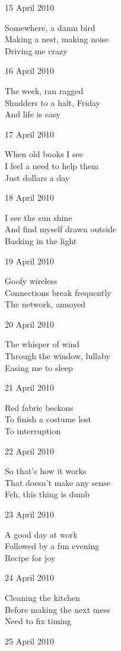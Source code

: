 \documentclass[12pt]{article}
\begin{document}
15 April 2010

Somewhere, a damn bird \\
Making a nest, making noise \\
Driving me crazy

16 April 2010

The week, ran ragged \\
Shudders to a halt, Friday \\
And life is easy

\newpage

17 April 2010

When old books I see \\
I feel a need to help them \\
Just dollars a day

18 April 2010

I see the sun shine \\ 
And find myself drawn outside \\
Basking in the light

19 April 2010

Goofy wireless \\
Connections break frequently \\
The network, annoyed

20 April 2010

The whisper of wind \\
Through the window, lullaby \\
Easing me to sleep

21 April 2010

Red fabric beckons \\
To finish a costume lost \\
To interruption

22 April 2010

So that's how it works \\
That doesn't make any sense \\
Feh, this thing is dumb

23 April 2010

A good day at work \\
Followed by a fun evening \\
Recipe for joy

\newpage

24 April 2010

Cleaning the kitchen \\
Before making the next mess \\
Need to fix timing

25 April 2010
\end{document}
